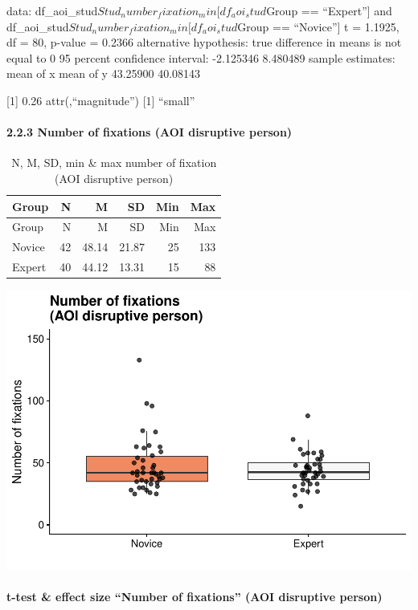 \documentclass[
]{article}
\begin{document}
data: df\_aoi\_stud\(Stud_number_fixation_min[df_aoi_stud\)Group ==
``Expert''{]} and
df\_aoi\_stud\(Stud_number_fixation_min[df_aoi_stud\)Group ==
``Novice''{]} t = 1.1925, df = 80, p-value = 0.2366 alternative
hypothesis: true difference in means is not equal to 0 95 percent
confidence interval: -2.125346 8.480489 sample estimates: mean of x mean
of y 43.25900 40.08143

{[}1{]} 0.26 attr(,``magnitude'') {[}1{]} ``small''

\paragraph{2.2.3 Number of fixations (AOI disruptive
person)}\label{number-of-fixations-aoi-disruptive-person}

\begin{longtable}[]{@{}lrrrrr@{}}
\caption{N, M, SD, min \& max number of fixation (AOI disruptive
person)}\tabularnewline
\toprule\noalign{}
Group & N & M & SD & Min & Max \\
\midrule\noalign{}
\endfirsthead
\toprule\noalign{}
Group & N & M & SD & Min & Max \\
\midrule\noalign{}
\endhead
\bottomrule\noalign{}
\endlastfoot
Novice & 42 & 48.14 & 21.87 & 25 & 133 \\
Expert & 40 & 44.12 & 13.31 & 15 & 88 \\
\end{longtable}

\includegraphics{expertise_2024_09_26_no_outlierdetection_MK_files/figure-latex/nof_disrup-1.pdf}

\paragraph{t-test \& effect size ``Number of fixations'' (AOI disruptive
person)}\label{t-test-effect-size-number-of-fixations-aoi-disruptive-person}
\end{document}
